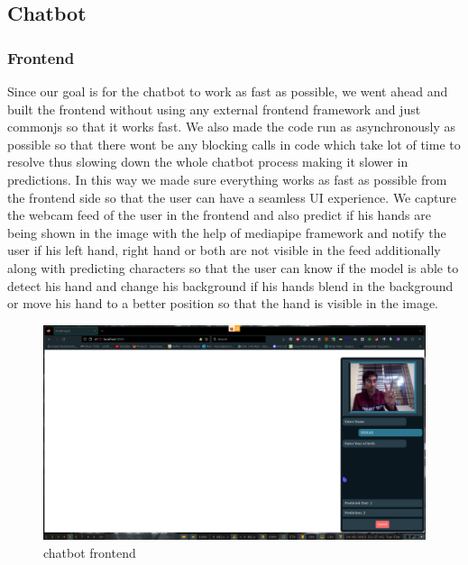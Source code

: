 \documentclass[12pt,a4paper]{report}
\begin{document}
\subsection{Chatbot}

\subsubsection{Frontend}
Since our goal is for the chatbot to work as fast as possible, we went ahead and built the frontend without using any external frontend framework and just commonjs so that it works fast. We also made the code run as asynchronously as possible so that there wont be any blocking calls in code which take lot of time to resolve thus slowing down the whole chatbot process making it slower in predictions. In this way we made sure everything works as fast as possible from the frontend side so that the user can have a seamless UI experience. We capture the webcam feed of the user in the frontend and also predict if his hands are being shown in the image with the help of mediapipe framework and notify the user if his left hand, right hand or both are not visible in the feed additionally along with predicting characters so that the user can know if the model is able to detect his hand and change his background if his hands blend in the background or move his hand to a better position so that the hand is visible in the image.
\begin{figure}[htbp]
	\centerline{\includegraphics[scale=0.2]{ui.png}}
	\caption{chatbot frontend}
	\label{ui}
\end{figure}
\end{document}
